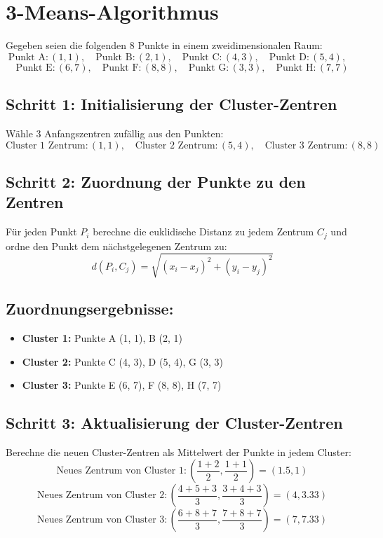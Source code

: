 \documentclass{article}
\begin{document}
\section*{3-Means-Algorithmus}

Gegeben seien die folgenden 8 Punkte in einem zweidimensionalen Raum:
\[
\text{Punkt A}: (1, 1), \quad \text{Punkt B}: (2, 1), \quad \text{Punkt C}: (4, 3), \quad \text{Punkt D}: (5, 4), \quad
\]
\[
\text{Punkt E}: (6, 7), \quad \text{Punkt F}: (8, 8), \quad \text{Punkt G}: (3, 3), \quad \text{Punkt H}: (7, 7)
\]

\subsection*{Schritt 1: Initialisierung der Cluster-Zentren}

Wähle 3 Anfangszentren zufällig aus den Punkten:
\[
\text{Cluster 1 Zentrum}: (1, 1), \quad \text{Cluster 2 Zentrum}: (5, 4), \quad \text{Cluster 3 Zentrum}: (8, 8)
\]

\subsection*{Schritt 2: Zuordnung der Punkte zu den Zentren}

Für jeden Punkt \( P_i \) berechne die euklidische Distanz zu jedem Zentrum \( C_j \) und ordne den Punkt dem nächstgelegenen Zentrum zu:
\[
d(P_i, C_j) = \sqrt{(x_i - x_j)^2 + (y_i - y_j)^2}
\]

\subsection*{Zuordnungsergebnisse:}

\begin{itemize}
    \item \textbf{Cluster 1:} Punkte A (1, 1), B (2, 1)
    \item \textbf{Cluster 2:} Punkte C (4, 3), D (5, 4), G (3, 3)
    \item \textbf{Cluster 3:} Punkte E (6, 7), F (8, 8), H (7, 7)
\end{itemize}

\subsection*{Schritt 3: Aktualisierung der Cluster-Zentren}

Berechne die neuen Cluster-Zentren als Mittelwert der Punkte in jedem Cluster:
\[
\text{Neues Zentrum von Cluster 1}: \left( \frac{1+2}{2}, \frac{1+1}{2} \right) = (1.5, 1)
\]
\[
\text{Neues Zentrum von Cluster 2}: \left( \frac{4+5+3}{3}, \frac{3+4+3}{3} \right) = (4, 3.33)
\]
\[
\text{Neues Zentrum von Cluster 3}: \left( \frac{6+8+7}{3}, \frac{7+8+7}{3} \right) = (7, 7.33)
\]
\end{document}
